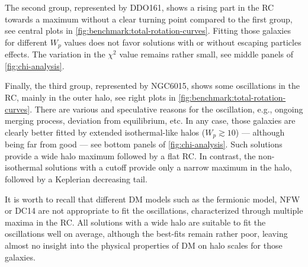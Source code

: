 The second group, represented by DDO161, shows a rising part in the RC towards a maximum without a clear turning point compared to the first group, see central plots in \cref{fig:benchmark:total-rotation-curves}. Fitting those galaxies for different $W_p$ values does not favor solutions with or without escaping particles effects. The variation in the $\chi^2$ value remains rather small, see middle panels of \cref{fig:chi-analysis}.

Finally, the third group, represented by NGC6015, shows some oscillations in the RC, mainly in the outer halo, see right plots in \cref{fig:benchmark:total-rotation-curves}. There are various and speculative reasons for the oscillation, e.g., ongoing merging process, deviation from equilibrium, etc. In any case, those galaxies are clearly better fitted by extended isothermal-like halos ($W_p \gtrsim 10$) --- although being far from good --- see bottom panels of \cref{fig:chi-analysis}. Such solutions provide a wide halo maximum followed by a flat RC. In contrast, the non-isothermal solutions with a cutoff provide only a narrow maximum in the halo, followed by a Keplerian decreasing tail.

It is worth to recall that different DM models such as the fermionic model, NFW or DC14 are not appropriate to fit the oscillations, characterized through multiple maxima in the RC. All solutions with a wide halo are suitable to fit the oscillations well on average, although the best-fits remain rather poor, leaving almost no insight into the physical properties of DM on halo scales for those galaxies.
